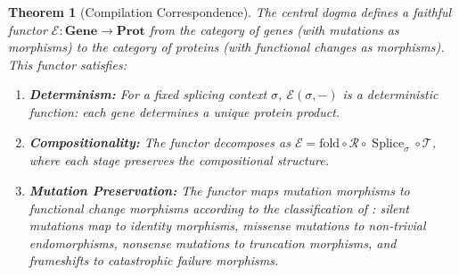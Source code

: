 \documentclass[12pt,a4paper]{article}
\newtheorem{theorem}{Theorem}[section]
\theoremstyle{definition}
\newcommand{\cat}[1]{\mathbf{#1}}
\newcommand{\Splice}{\operatorname{Splice}}
\begin{document}
\begin{theorem}[Compilation Correspondence]\label{thm:compilation-correspondence}
The central dogma defines a faithful functor $\mathcal{E} \colon \cat{Gene} \to \cat{Prot}$ from the category of genes (with mutations as morphisms) to the category of proteins (with functional changes as morphisms). This functor satisfies:
\begin{enumerate}[label=(\roman*)]
  \item \textbf{Determinism:} For a fixed splicing context $\sigma$, $\mathcal{E}(\sigma, -)$ is a deterministic function: each gene determines a unique protein product.
  \item \textbf{Compositionality:} The functor decomposes as $\mathcal{E} = \mathrm{fold} \circ \mathcal{R} \circ \Splice_\sigma \circ \mathcal{T}$, where each stage preserves the compositional structure.
  \item \textbf{Mutation Preservation:} The functor maps mutation morphisms to functional change morphisms according to the classification of : silent mutations map to identity morphisms, missense mutations to non-trivial endomorphisms, nonsense mutations to truncation morphisms, and frameshifts to catastrophic failure morphisms.
\end{enumerate}
\end{theorem}
\end{document}
